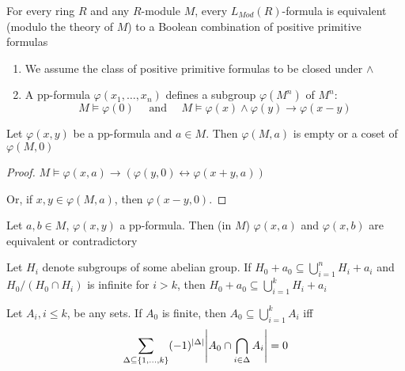 \documentclass[11pt]{article}
\begin{document}
\begin{theorem}[]
\label{thm3.3.5}
For every ring \(R\) and any \(R\)-module \(M\), every \(L_{Mod}(R)\)-formula
is equivalent (modulo the theory of \(M\)) to a Boolean combination of
positive primitive formulas
\end{theorem}

\begin{remark}
\begin{enumerate}
\item We assume the class of positive primitive formulas to be closed under \(\wedge\)
\item A pp-formula \(\varphi(x_1,\dots,x_n)\) defines a subgroup \(\varphi(M^n)\) of \(M^n\):
\begin{equation*}
M\vDash\varphi(0) \quad\text{ and }\quad M\vDash\varphi(x)\wedge\varphi(y)\to\varphi(x-y)
\end{equation*}
\end{enumerate}
\end{remark}

\begin{lemma}[]
\label{lemma3.3.7}
Let \(\varphi(x,y)\) be a pp-formula and \(a\in M\). Then \(\varphi(M,a)\) is empty or a coset of \(\varphi(M,0)\)
\end{lemma}

\begin{proof}
\(M\vDash\varphi(x,a)\to(\varphi(y,0)\leftrightarrow\varphi(x+y,a))\)

Or, if \(x,y\in \varphi(M,a)\), then \(\varphi(x-y,0)\).
\end{proof}

\begin{corollary}[]
Let \(a,b\in M\), \(\varphi(x,y)\) a pp-formula. Then (in \(M\)) \(\varphi(x,a)\) and \(\varphi(x,b)\) are equivalent
or contradictory
\end{corollary}

\begin{lemma}[B. H. Neumann]
\label{lemma3.3.9}
Let \(H_i\) denote subgroups of some abelian group. If \(H_0+a_0\subseteq\bigcup_{i=1}^nH_i+a_i\)
and \(H_0/(H_0\cap H_i)\) is infinite for \(i>k\), then \(H_0+a_0\subseteq\bigcup_{i=1}^kH_i+a_i\)
\end{lemma}

\begin{lemma}[]
Let \(A_i,i\le k\), be any sets. If \(A_0\) is finite, then \(A_0\subseteq\bigcup_{i=1}^k A_i\) iff
\begin{equation*}
\sum_{\Delta\subseteq\{1,\dots,k\}}(-1)^{\abs{\Delta}}\abs{A_0\cap\bigcap_{i\in\Delta}A_i}=0
\end{equation*}
\end{lemma}
\end{document}
